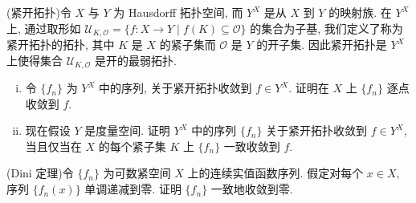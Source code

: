 \documentclass[../../main.tex]{subfiles}
\begin{document}
\begin{exercise}\label{exercise:ch11-45}
(紧开拓扑)令 $X$ 与 $Y$ 为 Hausdorff 拓扑空间, 而 $Y^{X}$ 是从 $X$ 到 $Y$ 的映射族. 在 $Y^{X}$ 上, 通过取形如 $\mathcal{U}_{K,\mathcal{O}}=\{f:X\to Y\mid f(K)\subseteq\mathcal{O}\}$ 的集合为子基, 我们定义了称为紧开拓扑的拓扑, 其中 $K$ 是 $X$ 的紧子集而 $\mathcal{O}$ 是 $Y$ 的开子集. 因此紧开拓扑是 $Y^{X}$ 上使得集合 $\mathcal{U}_{K,\mathcal{O}}$ 是开的最弱拓扑.
\begin{enumerate}[(i)]
\item 令 $\{f_{n}\}$ 为 $Y^{X}$ 中的序列, 关于紧开拓扑收敛到 $f\in Y^{X}$. 证明在 $X$ 上 $\{f_{n}\}$ 逐点收敛到 $f$.
\item 现在假设 $Y$ 是度量空间. 证明 $Y^{X}$ 中的序列 $\{f_{n}\}$ 关于紧开拓扑收敛到 $f\in Y^{X}$, 当且仅当在 $X$ 的每个紧子集 $K$ 上 $\{f_{n}\}$ 一致收敛到 $f$.
\end{enumerate}
\end{exercise}

\begin{exercise}\label{exercise:ch11-46}
(Dini 定理)令 $\{f_{n}\}$ 为可数紧空间 $X$ 上的连续实值函数序列. 假定对每个 $x\in X$, 序列 $\{f_{n}(x)\}$ 单调递减到零. 证明 $\{f_{n}\}$ 一致地收敛到零.
\end{exercise}
\end{document}
